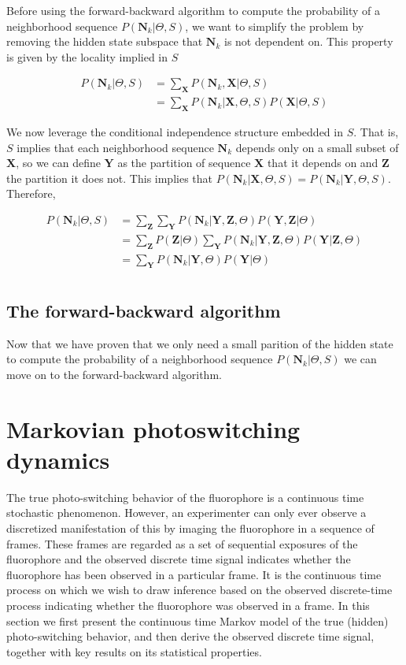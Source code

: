 \documentclass{ucetd}
\begin{document}
Before using the forward-backward algorithm to compute the probability of a neighborhood sequence $P(\bm{N}_{k}|\Theta,S)$, we want to simplify the problem by removing the hidden state subspace that $\bm{N}_{k}$ is not dependent on. This property is given by the locality implied in $S$

\begin{align*}
P(\bm{N}_{k}|\Theta,S) &= \sum_{\bm{X}}P(\bm{N}_{k},\bm{X}|\Theta,S) \\
&= \sum_{\bm{X}}P(\bm{N}_{k}|\bm{X},\Theta,S)P(\bm{X}|\Theta,S)
\end{align*}

We now leverage the conditional independence structure embedded in $S$. That is, $S$ implies that each neighborhood sequence  $\bm{N}_{k}$ depends only on a small subset of $\bm{X}$, so we can define $\bm{Y}$ as the partition of sequence $\bm{X}$ that it depends on and $\bm{Z}$ the partition it does not. This implies that $P(\bm{N}_{k}|\bm{X},\Theta,S) = P(\bm{N}_{k}|\bm{Y},\Theta,S)$. Therefore,

\begin{align*}
P(\bm{N}_{k}|\Theta,S) &= \sum_{\bm{Z}}\sum_{\bm{Y}}P(\bm{N}_{k}|\bm{Y},\bm{Z},\Theta)P(\bm{Y},\bm{Z}|\Theta)\\
&= \sum_{\bm{Z}}P(\bm{Z}|\Theta)\sum_{\bm{Y}}P(\bm{N}_{k}|\bm{Y},\bm{Z},\Theta)P(\bm{Y}|\bm{Z},\Theta)\\
&= \sum_{\bm{Y}}P(\bm{N}_{k}|\bm{Y},\Theta)P(\bm{Y}|\Theta)\\
\end{align*}

\subsection{The forward-backward algorithm}

Now that we have proven that we only need a small parition of the hidden state to compute the probability of a neighborhood sequence $P(\bm{N}_{k}|\Theta,S)$ we can move on to the forward-backward algorithm.

\section{Markovian photoswitching dynamics}

The true photo-switching behavior of the fluorophore is a continuous time stochastic phenomenon. However, an experimenter can only ever observe a discretized manifestation of this
by imaging the fluorophore in a sequence of frames. These frames are regarded as a set of
sequential exposures of the fluorophore and the observed discrete time signal indicates whether
the fluorophore has been observed in a particular frame. It is the continuous time process on
which we wish to draw inference based on the observed discrete-time process indicating whether
the fluorophore was observed in a frame. In this section we first present the continuous time
Markov model of the true (hidden) photo-switching behavior, and then derive the observed
discrete time signal, together with key results on its statistical properties.
\end{document}
